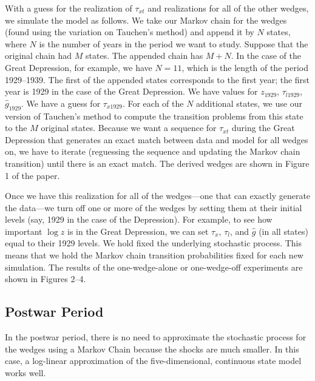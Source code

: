 With a guess for the realization of $\tau_{xt}$ 
and realizations for all of the other wedges, we simulate
the model as follows.   We take our Markov chain for
the wedges (found using the variation on Tauchen's method)
and append it by $N$ states, where $N$ 
is the number of years in the period we want to study.
Suppose that the 
original chain had $M$ states.  The appended chain has $M+N$.
In the case
of the Great Depression, for example, we have $N=11$,
which is the length of the period 1929--1939.
The first of the appended states corresponds to the
first year; the first year is 1929 in the case of the Great Depression.
We have values for $z_{1929}$, $\tau_{l1929}$, $\hat g_{1929}$. 
We have a guess for $\tau_{x1929}$.  
For each of the $N$ additional states, we use our version
of Tauchen's method to compute the transition problems from 
this state to the $M$ original states.
Because we want a sequence for $\tau_{xt}$ during the Great
Depression that generates an exact match between data and 
model for all wedges on, we have to iterate (reguessing
the sequence and updating the Markov chain transition)
until there is an exact match.
The derived wedges are shown in Figure 1 of the paper.

Once we have this realization for all of the wedges---one that
can exactly generate the data---we turn off one or more
of the wedges by setting them at their initial levels (say, 1929
in the case of the Depression).    For example, to
see how important $\log z$ is in the Great Depression, 
we can set $\tau_{x}$, $\tau_{l}$, and $\hat g$ (in 
all states) equal to their 1929 levels.  We hold fixed
the underlying stochastic process.  This means that
we hold the Markov chain transition probabilities fixed
for each new simulation.  
The results of the one-wedge-alone or one-wedge-off
experiments are shown in Figures 2--4.

\subsection{Postwar Period}

In the postwar period, there is no need to approximate
the stochastic process for the wedges using a Markov
Chain because the shocks are much smaller. In this case,
a log-linear approximation of the five-dimensional,
continuous state model works well.  


